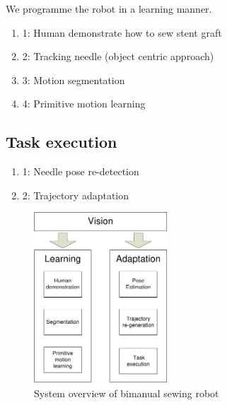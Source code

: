 We programme the robot in a learning manner. 

\begin{enumerate}
\item{1}: Human demonstrate how to sew stent graft


\item{2}: Tracking needle (object centric approach)
\item{3}: Motion segmentation
\item{4}: Primitive motion learning
\end{enumerate}

\subsection{Task execution}

\begin{enumerate}
\item{1}: Needle pose re-detection
\item{2}: Trajectory adaptation
\end{enumerate}

\begin{figure}
\centering
{
\includegraphics[width=5cm]{./fig/overview.pdf}
\caption{\scriptsize{System overview of bimanual sewing robot}}

\label{fig:overview}
}
\end{figure} 
